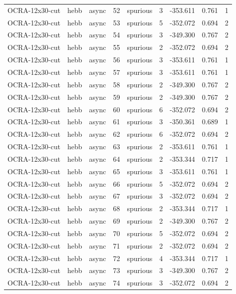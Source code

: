 \begin{tabular}{lllrlrrrr}
OCRA-12x30-cut & hebb & async & 52 & spurious & 3 & -353.611 & 0.761 & 1 \\
OCRA-12x30-cut & hebb & async & 53 & spurious & 5 & -352.072 & 0.694 & 2 \\
OCRA-12x30-cut & hebb & async & 54 & spurious & 3 & -349.300 & 0.767 & 2 \\
OCRA-12x30-cut & hebb & async & 55 & spurious & 2 & -352.072 & 0.694 & 2 \\
OCRA-12x30-cut & hebb & async & 56 & spurious & 3 & -353.611 & 0.761 & 1 \\
OCRA-12x30-cut & hebb & async & 57 & spurious & 3 & -353.611 & 0.761 & 1 \\
OCRA-12x30-cut & hebb & async & 58 & spurious & 2 & -349.300 & 0.767 & 2 \\
OCRA-12x30-cut & hebb & async & 59 & spurious & 2 & -349.300 & 0.767 & 2 \\
OCRA-12x30-cut & hebb & async & 60 & spurious & 6 & -352.072 & 0.694 & 2 \\
OCRA-12x30-cut & hebb & async & 61 & spurious & 3 & -350.361 & 0.689 & 1 \\
OCRA-12x30-cut & hebb & async & 62 & spurious & 6 & -352.072 & 0.694 & 2 \\
OCRA-12x30-cut & hebb & async & 63 & spurious & 2 & -353.611 & 0.761 & 1 \\
OCRA-12x30-cut & hebb & async & 64 & spurious & 2 & -353.344 & 0.717 & 1 \\
OCRA-12x30-cut & hebb & async & 65 & spurious & 3 & -353.611 & 0.761 & 1 \\
OCRA-12x30-cut & hebb & async & 66 & spurious & 5 & -352.072 & 0.694 & 2 \\
OCRA-12x30-cut & hebb & async & 67 & spurious & 3 & -352.072 & 0.694 & 2 \\
OCRA-12x30-cut & hebb & async & 68 & spurious & 2 & -353.344 & 0.717 & 1 \\
OCRA-12x30-cut & hebb & async & 69 & spurious & 2 & -349.300 & 0.767 & 2 \\
OCRA-12x30-cut & hebb & async & 70 & spurious & 5 & -352.072 & 0.694 & 2 \\
OCRA-12x30-cut & hebb & async & 71 & spurious & 2 & -352.072 & 0.694 & 2 \\
OCRA-12x30-cut & hebb & async & 72 & spurious & 4 & -353.344 & 0.717 & 1 \\
OCRA-12x30-cut & hebb & async & 73 & spurious & 3 & -349.300 & 0.767 & 2 \\
OCRA-12x30-cut & hebb & async & 74 & spurious & 3 & -352.072 & 0.694 & 2 \\

\end{tabular}
